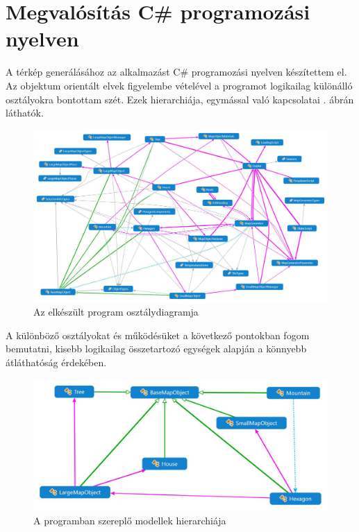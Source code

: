 \chapter{Megvalósítás C\# programozási nyelven}

A térkép generálásához az alkalmazást C\# programozási nyelven készítettem el. Az objektum orientált elvek figyelembe vételével a programot logikailag különálló osztályokra bontottam szét. Ezek hierarchiája, egymással való kapcsolatai . ábrán láthatók.


\begin{figure}[h!]
\centering
\includegraphics[scale=0.25]{kepek/White_Monster.JPG}
\caption{Az elkészült program osztálydiagramja}
\label{fig:szorny}
\end{figure}

A különböző osztályokat és működésüket a következő pontokban fogom bemutatni, kisebb logikailag összetartozó egységek alapján a könnyebb átláthatóság érdekében.

\begin{figure}[h!]
\centering
\includegraphics[scale=0.3]{kepek/White_modellek.JPG}
\caption{A programban szereplő modellek hierarchiája}
\label{fig:modellek}
\end{figure}


